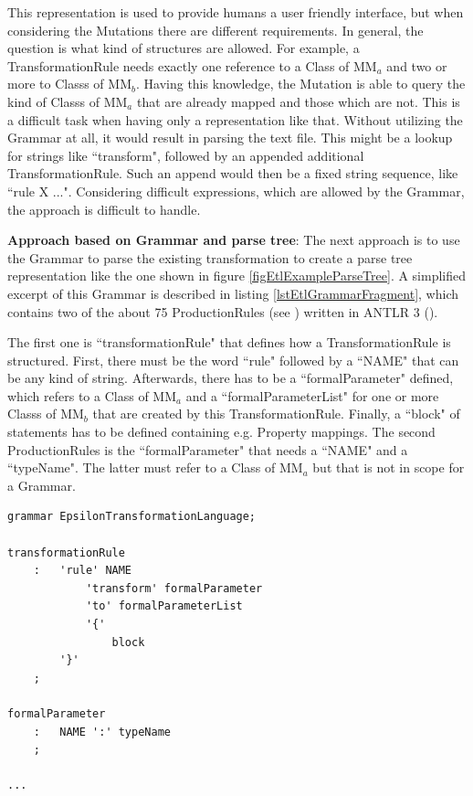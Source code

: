 
This representation is used to provide humans a user friendly interface, but when considering the \glspl{Mutation} there are different requirements. In general, the question is what kind of structures are allowed. For example, a \gls{TransformationRule} needs exactly one reference to a \gls{Class} of MM$_a$ and two or more to \glspl{Class} of MM$_b$. Having this knowledge, the \gls{Mutation} is able to query the kind of \glspl{Class} of MM$_a$ that are already mapped and those which are not. This is a difficult task when having only a representation like that. Without utilizing the \gls{Grammar} at all, it would result in parsing the text file. This might be a lookup for strings like ``transform", followed by an appended additional \gls{TransformationRule}. Such an append would then be a fixed string sequence, like ``rule X ...". Considering difficult expressions, which are allowed by the \gls{Grammar}, the approach is difficult to handle.

\textbf{Approach based on \gls{Grammar} and parse tree}: The next approach is to use the \gls{Grammar} to parse the existing transformation to create a parse tree representation like the one shown in figure \ref{figEtlExampleParseTree}. A simplified excerpt of this \gls{Grammar} is described in listing \ref{lstEtlGrammarFragment}, which contains two of the about 75 \glspl{ProductionRule} (see \cite{EclipseFoundation2014}) written in ANTLR 3 (\cite{Atlassian2014}). 

The first one is ``transformationRule" that defines how a \gls{TransformationRule} is structured. First, there must be the word ``rule" followed by a ``NAME" that can be any kind of string. Afterwards, there has to be a ``formalParameter" defined, which refers to a \gls{Class} of MM$_a$ and a ``formalParameterList" for one or more \glspl{Class} of MM$_b$ that are created by this \gls{TransformationRule}. Finally, a ``block" of statements has to be defined containing e.g. \gls{Property} mappings. The second \glspl{ProductionRule} is the ``formalParameter" that needs a ``NAME" and a ``typeName". The latter must refer to a \gls{Class} of MM$_a$ but that is not in scope for a \gls{Grammar}.

\begin{lstlisting}[language=ANTLR,caption={\Gls{EpsilonTransformationLanguage} specified in ANTLR \Gls{Grammar} (Simplified fragment)},label={lstEtlGrammarFragment}]
grammar EpsilonTransformationLanguage;

transformationRule
	:	'rule' NAME 
			'transform' formalParameter 
			'to' formalParameterList
			'{'
			 	block 
		'}'
	;

formalParameter
	:	NAME ':' typeName
	;
	
...
\end{lstlisting}

